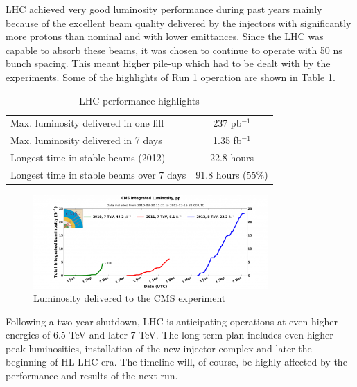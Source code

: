 LHC achieved very good luminosity performance during past years mainly because of the excellent beam quality delivered by the injectors with significantly more protons than nominal and with lower emittances. Since the LHC was capable to absorb these beams, it was chosen to continue to operate with 50 ns bunch spacing. This meant higher pile-up which had to be dealt with by the experiments. Some of the highlights of Run 1 operation are shown in Table \ref{tab:LHC_highlights}.
\begin{table}[h]
\centering
  \caption{LHC performance highlights}
  \label{tab:LHC_highlights}
  \begin{tabular}{ l  c }
      \hline
      \hline
      Max. luminosity delivered in one fill & 237 pb$^{-1}$  \\
      Max. luminosity delivered in 7 days & 1.35 fb$^{-1}$  \\
      Longest time in stable beams (2012) & 22.8 hours \\
      Longest time in stable beams over 7 days & 91.8 hours (55$\%$) \\
      \hline
      \hline 
  \end{tabular}
\end{table}

\begin{figure}[htbp]
	\centering
		\includegraphics[width=0.8\textwidth]{Figures/lumi.png}
	\caption[Luminosity delivered to the CMS experiment]{Luminosity delivered to the CMS experiment}
	\label{fig:LHC_lumi}
\end{figure}
 
Following a two year shutdown, LHC is anticipating operations at even higher energies of 6.5 TeV and later 7 TeV. The long term plan includes even higher peak luminosities, installation of the new injector complex and later the beginning of HL-LHC era. The timeline will, of course, be highly affected by the performance and results of the next run.